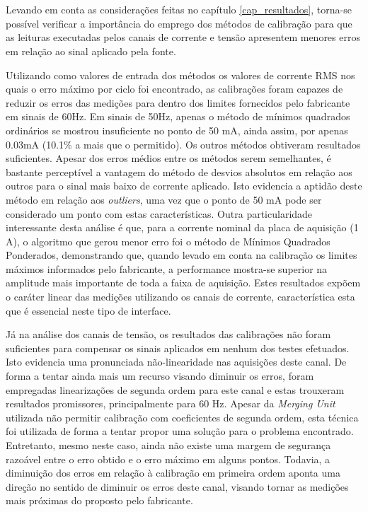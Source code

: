 

\chapter{}

   Levando em conta as considerações feitas no capítulo \ref{cap_resultados}, torna-se possível verificar a importância do emprego dos métodos de calibração para que as leituras executadas pelos canais de corrente e tensão apresentem menores erros em relação ao sinal aplicado pela fonte. 
   
   Utilizando como valores de entrada dos métodos os valores de corrente RMS nos quais o erro máximo por ciclo foi encontrado, as calibrações foram capazes de reduzir os erros das medições para dentro dos limites fornecidos pelo fabricante em sinais de 60Hz. Em sinais de 50Hz, apenas o método  de mínimos quadrados ordinários se mostrou insuficiente no ponto de 50 mA, ainda assim, por apenas 0.03mA (10.1\% a mais que o permitido). Os outros métodos obtiveram resultados suficientes. Apesar dos erros médios entre os métodos serem semelhantes, é bastante perceptível a vantagem do método de desvios absolutos em relação aos outros para o sinal mais baixo de corrente aplicado. Isto evidencia a aptidão deste método em relação aos \textit{outliers}, uma vez que o ponto de 50 mA pode ser considerado um ponto com estas características. Outra particularidade interessante desta análise é que, para a corrente nominal da placa de aquisição (1 A), o algoritmo que gerou menor erro foi o método de Mínimos Quadrados Ponderados, demonstrando que, quando levado em conta na calibração os limites máximos informados pelo fabricante, a performance mostra-se superior na amplitude mais importante de toda a faixa de aquisição. Estes resultados expõem o caráter linear das medições utilizando os canais de corrente, característica esta que é essencial neste tipo de interface.
   
   Já na análise dos canais de tensão, os resultados das calibrações não foram suficientes para compensar os sinais aplicados em nenhum dos testes efetuados. Isto evidencia uma pronunciada não-linearidade nas aquisições deste canal. De forma a tentar ainda mais um recurso visando diminuir os erros, foram empregadas linearizações de segunda ordem para este canal e estas trouxeram resultados promissores, principalmente para 60 Hz. Apesar da \textit{Merging Unit} utilizada não permitir calibração com coeficientes de segunda ordem, esta técnica foi utilizada de forma a tentar propor uma solução para o problema encontrado. Entretanto, mesmo neste caso, ainda não existe uma margem de segurança razoável entre o erro obtido e o erro máximo em alguns pontos. Todavia, a diminuição dos erros em relação à calibração em primeira ordem aponta uma direção no sentido de diminuir os erros deste canal, visando tornar as medições mais próximas do proposto pelo fabricante. 
  
